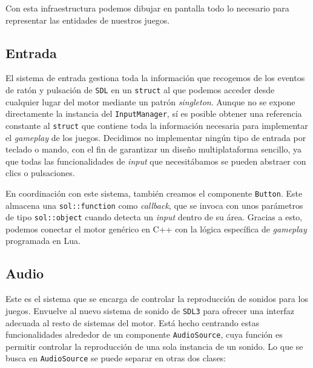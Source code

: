 Con esta infraestructura podemos dibujar en pantalla todo lo necesario para representar las entidades de nuestros juegos. 

\subsection{Entrada}
El sistema de entrada gestiona toda la información que recogemos de los eventos de ratón y pulsación de \texttt{SDL} en un \texttt{struct} al que podemos acceder desde cualquier lugar del motor mediante un patrón \textit{singleton}. Aunque no se expone directamente la instancia del \texttt{InputManager}, sí es posible obtener una referencia constante al \texttt{struct} que contiene toda la información necesaria para implementar el \textit{gameplay} de los juegos. Decidimos no implementar ningún tipo de entrada por teclado o mando, con el fin de garantizar un diseño multiplataforma sencillo, ya que todas las funcionalidades de \textit{input} que necesitábamos se pueden abstraer con clics o pulsaciones. 

\medskip

En coordinación con este sistema, también creamos el componente \texttt{Button}. Este almacena una \texttt{sol::function} como \textit{callback}, que se invoca con unos parámetros de tipo \texttt{sol::object} cuando detecta un \textit{input} dentro de su área. Gracias a esto, podemos conectar el motor genérico en C++ con la lógica específica de \textit{gameplay} programada en Lua. 

\subsection{Audio}
Este es el sistema que se encarga de controlar la reproducción de sonidos para los juegos. Envuelve al nuevo sistema de sonido de \texttt{SDL3} para ofrecer una interfaz adecuada al resto de sistemas del motor. Está hecho centrando estas funcionalidades alrededor de un componente \texttt{AudioSource}, cuya función es permitir controlar la reproducción de una sola instancia de un sonido. Lo que se busca en \texttt{AudioSource} se puede separar en otras dos clases:

